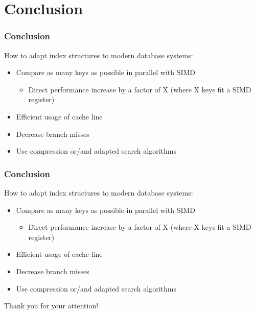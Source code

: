 \documentclass{beamer}
\begin{document}
\begin{frame}


\end{frame}

\section{Conclusion}
\begin{frame}
\frametitle{Conclusion}
How to adapt index structures to modern database systems:
\begin{itemize}[label=\textbullet,leftmargin=2em]
\item Compare as many keys as possible in parallel with SIMD
\begin{itemize}[label=\textbullet,leftmargin=1em]
\item Direct performance increase  by a factor of X (where X keys fit a SIMD register)
\end{itemize}
\item Efficient usage of cache line
\item Decrease branch misses
\item Use compression or/and adapted search algorithms
\end{itemize}
\end{frame}

\begin{frame}
\frametitle{Conclusion}
How to adapt index structures to modern database systems:
\begin{itemize}[label=\textbullet,leftmargin=2em]
\item Compare as many keys as possible in parallel with SIMD
\begin{itemize}[label=\textbullet,leftmargin=1em]
\item Direct performance increase  by a factor of X (where X keys fit a SIMD register)
\end{itemize}
\item Efficient usage of cache line
\item Decrease branch misses
\item Use compression or/and adapted search algorithms
\end{itemize}
\vspace*{\fill}
\begin{center}
\huge Thank you for your attention!
\end{center}
\end{frame}


\begin{frame}


\end{frame}
\end{document}
